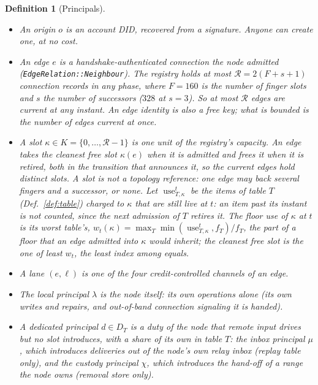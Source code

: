 \documentclass[journal]{IEEEtran}
\newtheorem{definition}{Definition}
\newcommand{\Rg}{\mathcal{R}}
\newcommand{\use}{\operatorname{use}}
\begin{document}
\begin{definition}[Principals]\label{def:principals}
\begin{itemize}[leftmargin=1.2em]
\item An \emph{origin} $o$ is an account DID, recovered from a signature.  Anyone can create
one, at no cost.
\item An \emph{edge} $e$ is a handshake-authenticated connection the node admitted
(\texttt{EdgeRelation::Neighbour}).  The registry holds at most
$\Rg=2(F+s+1)$ connection records in any phase, where $F=160$ is the number of finger slots and
$s$ the number of successors ($328$ at $s=3$).  So at most $\Rg$ edges are \emph{current} at
any instant.  An edge identity is also a free key; what is bounded is the number of edges
current at once.
\item A \emph{slot} $\kappa\in K=\{0,\dots,\Rg-1\}$ is one unit of the registry's capacity.  An
edge takes the \emph{cleanest} free slot $\kappa(e)$ when it is admitted and frees it when it
is retired, both in the transition that announces it, so the current edges hold distinct slots.
A slot is not a topology reference: one edge may back several fingers and a successor, or none.
Let $\use^{t}_{T,\kappa}$ be the items of table $T$ (Def.~\ref{def:table}) charged to $\kappa$
that are still live at $t$: an item past its instant is not counted, since the next admission of
$T$ retires it.  The \emph{floor use} of $\kappa$ at $t$ is its worst table's,
$w_t(\kappa)=\max_T\min(\use^{t}_{T,\kappa},f_T)/f_T$, the part of a floor that an edge admitted
into $\kappa$ would inherit; the cleanest free slot is the one of least $w_t$, the least index
among equals.
\item A \emph{lane} $(e,\ell)$ is one of the four credit-controlled channels of an edge.
\item The \emph{local} principal $\lambda$ is the node itself: its own operations alone (its
own writes and repairs, and out-of-band connection signaling it is handed).
\item A \emph{dedicated} principal $d\in D_T$ is a duty of the node that remote input drives
but no slot introduces, with a share of its own in table $T$: the inbox principal $\mu$, which
introduces deliveries out of the node's own relay inbox (replay table only), and the custody
principal $\chi$, which introduces the hand-off of a range the node owns (removal store only).
\end{itemize}
\end{definition}
\end{document}
